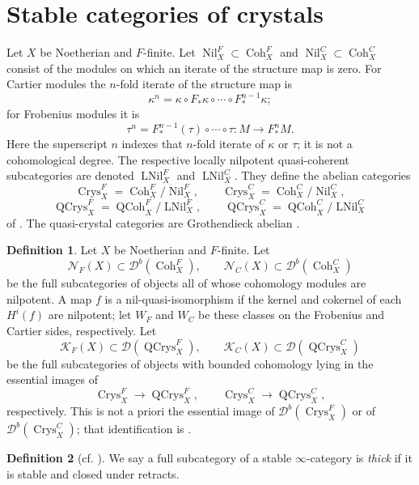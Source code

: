 \documentclass[11pt]{amsart}
\newcommand{\cN}{\mathcal{N}}
\newcommand{\QCoh}{\operatorname{{QCoh}}}
\newcommand{\Coh}{\operatorname{{Coh}}}
\newcommand{\Crys}{\operatorname{Crys}}
\newcommand{\QCrys}{\operatorname{QCrys}}
\newcommand{\Nil}{\operatorname{Nil}}
\newcommand{\LNil}{\operatorname{LNil}}
\newcommand{\Db}{\mathcal D^b}
\newcommand{\KF}{\mathcal K_F}
\newcommand{\KC}{\mathcal K_C}
\theoremstyle{plain}
\theoremstyle{definition}
\newtheorem{definition}[definition]{Definition}
\numberwithin{equation}{section}
\begin{document}
\section{Stable categories of crystals}\label{sec:crystals}
Let $X$ be Noetherian and $F$-finite.
Let $\Nil^F_X\subset\Coh^F_X$ and $\Nil^C_X\subset\Coh^C_X$ consist of the modules on which an iterate of the structure map is zero.
For Cartier modules the $n$-fold iterate of the structure map is
\[
 \kappa^{n}=\kappa\circ F_*\kappa\circ\cdots\circ F_*^{n-1}\kappa;
\]
for Frobenius modules it is
\[
 \tau^{n}=F_*^{n-1}(\tau)\circ\cdots\circ\tau:M\to F_*^nM.
\]
Here the superscript $n$ indexes that $n$-fold iterate of $\kappa$ or $\tau$; it is not a cohomological degree.
The respective locally nilpotent quasi-coherent subcategories are denoted $\LNil^F_X$ and $\LNil^C_X$.
They define the abelian categories
\[
 \Crys^F_X=\Coh^F_X/\Nil^F_X,\qquad
 \Crys^C_X=\Coh^C_X/\Nil^C_X,
\]
\[
 \QCrys^F_X=\QCoh^F_X/\LNil^F_X,\qquad
 \QCrys^C_X=\QCoh^C_X/\LNil^C_X
\]
of \cite[Definition 2.2.8; Definitions 3.3.1 and 3.3.4]{Bau}.
The quasi-crystal categories are Grothendieck abelian \cite[Lemma 2.2.10; Lemma 3.3.5]{Bau}.

\begin{definition}\label{def:nil-complex}
Let $X$ be Noetherian and $F$-finite.
Let
\[
 \cN_F(X)\subset\Db(\Coh^F_X),\qquad
 \cN_C(X)\subset\Db(\Coh^C_X)
\]
be the full subcategories of objects all of whose cohomology modules are nilpotent.
A map $f$ is a nil-quasi-isomorphism if the kernel and cokernel of each $H^i(f)$ are nilpotent; let $W_F$ and $W_C$ be these classes on the Frobenius and Cartier sides, respectively.
Let
\[
 \KF(X)\subset\mathcal D(\QCrys^F_X),\qquad
 \KC(X)\subset\mathcal D(\QCrys^C_X)
\]
be the full subcategories of objects with bounded cohomology lying in the essential images of
\[
 \Crys^F_X\to\QCrys^F_X,\qquad
 \Crys^C_X\to\QCrys^C_X,
\]
respectively.
This is not a priori the essential image of $\Db(\Crys^F_X)$ or of $\Db(\Crys^C_X)$; that identification is .
\end{definition}

\begin{definition}[{cf. \cite[Lecture 26, Definition 1]{Chromatic}}]\label{def:thick}
We say a full subcategory of a stable $\infty$-category is \textit{thick} if it is stable and closed under retracts.
\end{definition}
\end{document}
